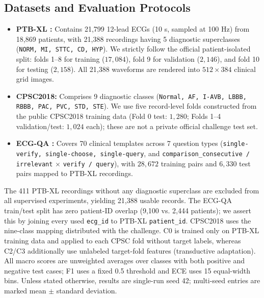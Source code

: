 \documentclass[preprint,12pt]{elsarticle}
\begin{document}
\subsection{Datasets and Evaluation Protocols}
\begin{itemize}
    \item \textbf{PTB-XL \cite{ptbxl2020}:} Contains 21,799 12-lead ECGs (10 s, sampled at 100 Hz) from 18,869 patients, with 21,388 recordings having 5 diagnostic superclasses (\texttt{NORM, MI, STTC, CD, HYP}). We strictly follow the official patient-isolated split: folds 1--8 for training ($17,084$), fold 9 for validation ($2,146$), and fold 10 for testing ($2,158$). All 21,388 waveforms are rendered into $512 \times 384$ clinical grid images.
    \item \textbf{CPSC2018:} Comprises 9 diagnostic classes (\texttt{Normal, AF, I-AVB, LBBB, RBBB, PAC, PVC, STD, STE}). We use five record-level folds constructed from the public CPSC2018 training data (Fold 0 test: $1,280$; Folds 1--4 validation/test: $1,024$ each); these are not a private official challenge test set.
    \item \textbf{ECG-QA \cite{ecgqa2023}:} Covers 70 clinical templates across 7 question types (\texttt{single-verify, single-choose, single-query}, and \texttt{comparison\_consecutive / irrelevant} $\times$ \texttt{verify / query}), with $28,672$ training pairs and $6,330$ test pairs mapped to PTB-XL recordings.
\end{itemize}

The 411 PTB-XL recordings without any diagnostic superclass are excluded from all supervised experiments, yielding 21,388 usable records. The ECG-QA train/test split has zero patient-ID overlap (9,100 vs. 2,444 patients); we assert this by joining every used \texttt{ecg\_id} to PTB-XL \texttt{patient\_id}. CPSC2018 uses the nine-class mapping distributed with the challenge. C0 is trained only on PTB-XL training data and applied to each CPSC fold without target labels, whereas C2/C3 additionally use unlabeled target-fold features (transductive adaptation). All macro scores are unweighted averages over classes with both positive and negative test cases; F1 uses a fixed 0.5 threshold and ECE uses 15 equal-width bins. Unless stated otherwise, results are single-run seed 42; multi-seed entries are marked mean $\pm$ standard deviation.
\end{document}
